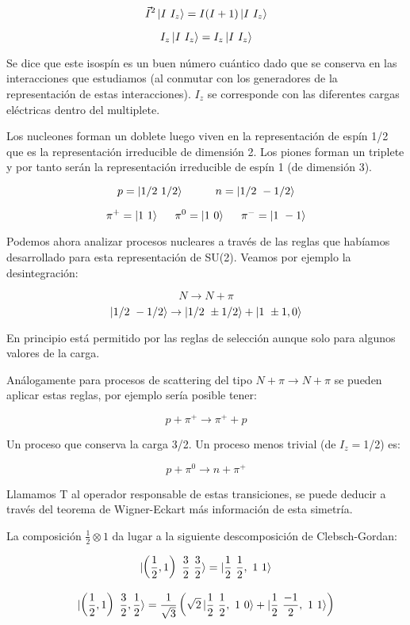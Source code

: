 $$\Vec{I}^2 \ket{I \ I_z} = I(I+1)\ket{I \ I_z}$$

$$I_z \ket{I \ I_z} = I_z \ket{I \ I_z}$$

Se dice que este isospín es un buen número cuántico dado que se conserva en las interacciones que estudiamos (al conmutar con los generadores de la representación de estas interacciones). $I_z$ se corresponde con las diferentes cargas eléctricas dentro del multiplete.

\smallskip
Los nucleones forman un doblete luego viven en la representación de espín 1/2 que es la representación irreducible de dimensión 2. Los piones forman un triplete y por tanto serán la representación irreducible de espín 1 (de dimensión 3).

$$p=\ket{1/2 \ 1/2} \hspace{1cm} n=\ket{1/2 \ -1/2}$$

$$\pi^+ = \ket{1 \ 1} \hspace{0.5cm} \pi^0 = \ket{1 \ 0} \hspace{0.5cm} \pi^- = \ket{1 \ -1} $$

Podemos ahora analizar procesos nucleares a través de las reglas que habíamos desarrollado para esta representación de SU(2). Veamos por ejemplo la desintegración:

$$N \to N + \pi$$
$$\ket{1/2 \ -1/2} \to \ket{1/2 \ \pm 1/2} + \ket{1 \ \pm 1,0}$$

En principio está permitido por las reglas de selección aunque solo para algunos valores de la carga.

\smallskip
Análogamente para procesos de scattering del tipo $N+\pi \to N + \pi$ se pueden aplicar estas reglas, por ejemplo sería posible tener:

$$p + \pi ^+ \to \pi ^+ + p$$

Un proceso que conserva la carga 3/2. Un proceso menos trivial (de $I_z=$1/2) es:

$$p + \pi ^0 \to n + \pi ^+$$

Llamamos T al operador responsable de estas transiciones, se puede deducir a través del teorema de Wigner-Eckart más información de esta simetría.

\smallskip
La composición $\frac{1}{2}\otimes 1$ da lugar a la siguiente descomposición de Clebsch-Gordan:

$$\ket{\left ( \frac{1}{2},1\right) \ \frac{3}{2} \ \frac{3}{2}}=\ket{\frac{1}{2} \ \frac{1}{2} , \ 1 \ 1}$$

$$\ket{\left ( \frac{1}{2},1\right) \ \frac{3}{2}, \frac{1}{2}}= \frac{1}{\sqrt{3}}\left ( \sqrt{2} \ket{\frac{1}{2} \ \frac{1}{2}, \ 1 \ 0 } + \ket{\frac{1}{2} \ \frac{-1}{2} , \ 1 \ 1}\right)$$

